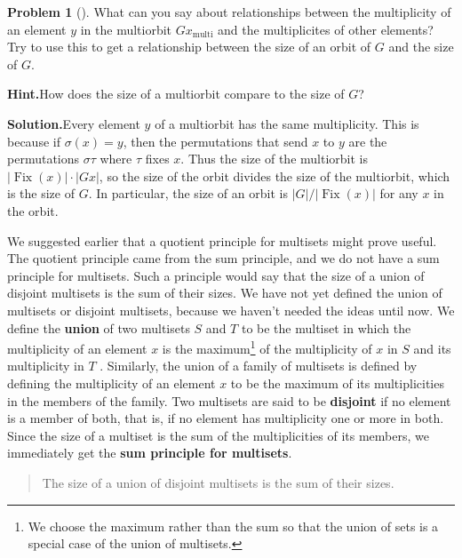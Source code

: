 \documentclass[10pt,]{book}
\newcommand{\terminology}[1]{\textbf{#1}}
\theoremstyle{plain}
\theoremstyle{definition}
\newtheorem{activity}[project]{Problem}
\theoremstyle{definition}
\numberwithin{equation}{chapter}
\DeclareMathOperator{\Fix}{Fix}
\begin{document}
\begin{activity}[]\label{activity-295}
What can you say about relationships between the multiplicity of an element \(y\) in the multiorbit \(Gx_{\text{multi}}\) and the multiplicites of other elements? Try to use this to get a relationship between the size of an orbit of \(G\) and the size of \(G\).%
\par\medskip\noindent%
\textbf{Hint.}\quad How does the size of a multiorbit compare to the size of \(G\)?%
\par\medskip\noindent%
\textbf{Solution.}\quad Every element \(y\) of a multiorbit has the same multiplicity. This is because if \(\sigma(x) = y\), then the permutations that send \(x\) to \(y\) are the permutations \(\sigma\tau\) where \(\tau\) fixes \(x\). Thus the size of the multiorbit is \(|\Fix(x)|\cdot |Gx|\), so the size of the orbit divides the size of the multiorbit, which is the size of \(G\). In particular, the size of an orbit is \(|G|/|\Fix(x)|\) for any \(x\) in the orbit.%
\end{activity}
We suggested earlier that a quotient principle for multisets might prove useful. The quotient principle came from the sum principle, and we do not have a sum principle for multisets. Such a principle would say that the size of a union of disjoint multisets is the sum of their sizes. We have not yet defined the union of multisets or disjoint multisets, because we haven't needed the ideas until now. We define the \terminology{union} of two multisets \(S\) and \(T\) to be the multiset in which the multiplicity of an element \(x\) is the maximum\footnote{We choose the maximum rather than the sum so that the union of sets is a special case of the union of multisets.\label{fn-23}} of the multiplicity of \(x\) in \(S\) and its multiplicity in \(T\) . Similarly, the union of a family of multisets is defined by defining the multiplicity of an element \(x\) to be the maximum of its multiplicities in the members of the family. Two multisets are said to be \terminology{disjoint} if no element is a member of both, that is, if no element has multiplicity one or more in both. Since the size of a multiset is the sum of the multiplicities of its members, we immediately get the \terminology{sum principle for multisets}.%
\begin{quote}\hypertarget{blockquote-14}{}
The size of a union of disjoint multisets is the sum of their sizes. %
\end{quote}
\end{document}

